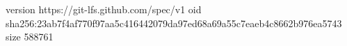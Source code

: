 version https://git-lfs.github.com/spec/v1
oid sha256:23ab7f4af770f97aa5c416442079da97ed68a69a55c7eaeb4c8662b976ea5743
size 588761
